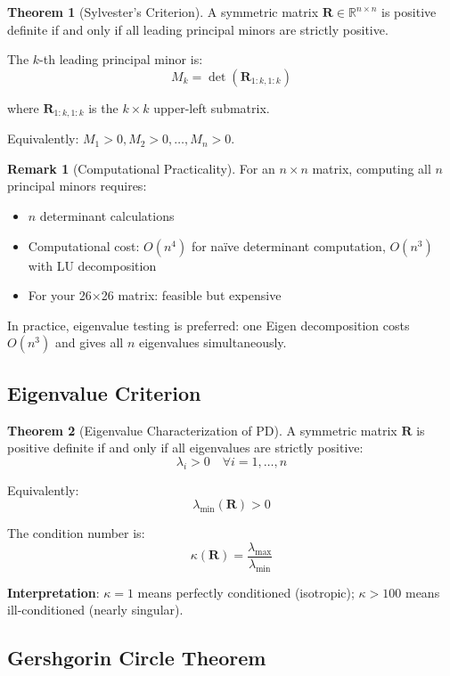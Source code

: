 \documentclass[12pt,a4paper]{article}
\theoremstyle{definition}
\newtheorem{theorem}{Theorem}
\newtheorem{remark}{Remark}
\begin{document}
\begin{theorem}[Sylvester's Criterion]
A symmetric matrix $\mathbf{R} \in \mathbb{R}^{n \times n}$ is positive definite if and only if all leading principal minors are strictly positive.

The $k$-th leading principal minor is:
\[
  M_k = \det(\mathbf{R}_{1:k, 1:k})
\]

where $\mathbf{R}_{1:k, 1:k}$ is the $k \times k$ upper-left submatrix.

Equivalently: $M_1 > 0, M_2 > 0, \ldots, M_n > 0$.
\end{theorem}

\begin{remark}[Computational Practicality]
For an $n \times n$ matrix, computing all $n$ principal minors requires:
\begin{itemize}
  \item $n$ determinant calculations
  \item Computational cost: $O(n^4)$ for naïve determinant computation, $O(n^3)$ with LU decomposition
  \item For your 26×26 matrix: feasible but expensive
\end{itemize}

In practice, eigenvalue testing is preferred: one Eigen decomposition costs $O(n^3)$ and gives all $n$ eigenvalues simultaneously.
\end{remark}

\subsection{Eigenvalue Criterion}

\begin{theorem}[Eigenvalue Characterization of PD]
A symmetric matrix $\mathbf{R}$ is positive definite if and only if all eigenvalues are strictly positive:
\[
  \lambda_i > 0 \quad \forall i = 1, \ldots, n
\]

Equivalently:
\[
  \lambda_{\min}(\mathbf{R}) > 0
\]

The condition number is:
\[
  \kappa(\mathbf{R}) = \frac{\lambda_{\max}}{\lambda_{\min}}
\]

\textbf{Interpretation}: $\kappa = 1$ means perfectly conditioned (isotropic); $\kappa > 100$ means ill-conditioned (nearly singular).
\end{theorem}

\subsection{Gershgorin Circle Theorem}
\end{document}
